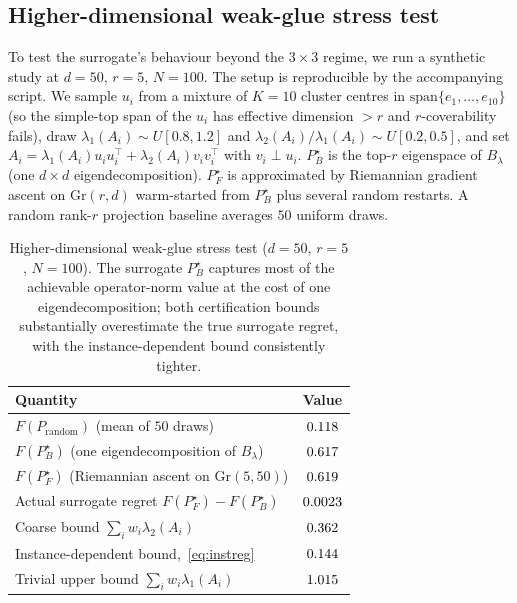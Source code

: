 \documentclass[final,3p,times]{elsarticle}
\newcommand{\Gr}{\mathrm{Gr}}
\begin{document}
\subsection{Higher-dimensional weak-glue stress test}
\label{sec:hidim}

To test the surrogate's behaviour beyond the $3\times 3$ regime,
we run a synthetic study at $d=50$, $r=5$, $N=100$.
The setup is reproducible by the accompanying script.
We sample $u_i$ from a mixture of $K=10$ cluster centres in
$\mathrm{span}\{e_1,\ldots,e_{10}\}$ (so the simple-top span of the
$u_i$ has effective dimension $>r$ and $r$-coverability fails),
draw $\lambda_1(A_i)\sim U[0.8,1.2]$ and
$\lambda_2(A_i)/\lambda_1(A_i)\sim U[0.2,0.5]$, and set
$A_i=\lambda_1(A_i)u_iu_i^\top+\lambda_2(A_i)v_iv_i^\top$ with
$v_i\perp u_i$.
$P_B^\star$ is the top-$r$ eigenspace of $B_\lambda$ (one
$d\times d$ eigendecomposition).
$P_F^\star$ is approximated by Riemannian gradient ascent on $\Gr(r,d)$
warm-started from $P_B^\star$ plus several random restarts.
A random rank-$r$ projection baseline averages $50$ uniform draws.

\begin{table}[tbp]
\caption{Higher-dimensional weak-glue stress test ($d=50$, $r=5$,
$N=100$). The surrogate $P_B^\star$ captures most of the achievable
operator-norm value at the cost of one eigendecomposition; both
certification bounds substantially overestimate the true surrogate
regret, with the instance-dependent bound consistently tighter.}
\label{tab:hidim}
\begin{center}
\begin{tabular}{lc}
\toprule
Quantity & Value \\
\midrule
$F(P_{\mathrm{random}})$ (mean of $50$ draws)        & $0.118$ \\
$F(P_B^\star)$ (one eigendecomposition of $B_\lambda$) & $0.617$ \\
$F(P_F^\star)$ (Riemannian ascent on $\Gr(5,50)$)    & $0.619$ \\
Actual surrogate regret $F(P_F^\star)-F(P_B^\star)$  & $0.0023$ \\
Coarse bound $\sum_i w_i\lambda_2(A_i)$              & $0.362$ \\
Instance-dependent bound,~\eqref{eq:instreg}         & $0.144$ \\
Trivial upper bound $\sum_i w_i\lambda_1(A_i)$       & $1.015$ \\
\bottomrule
\end{tabular}
\end{center}
\end{table}
\end{document}
